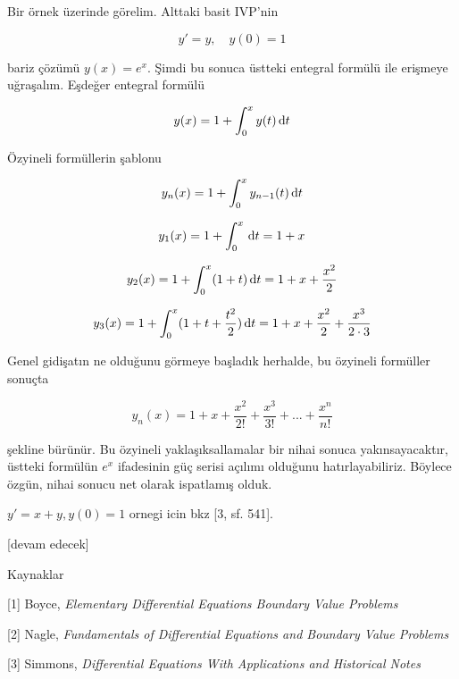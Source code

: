 \documentclass[12pt,fleqn]{article}\usepackage{../../common}
\begin{document}
Bir örnek üzerinde görelim. Alttaki basit IVP'nin

$$
y' = y, \quad y(0)=1
$$

bariz çözümü $y(x) = e^x$. Şimdi bu sonuca üstteki entegral formülü ile
erişmeye uğraşalım. Eşdeğer entegral formülü

$$
y(x) = 1 + \int _{0}^{x} y(t) \,\mathrm{d} t
$$

Özyineli formüllerin şablonu

$$
y_n(x) = 1 + \int_{0}^{x} y_{n-1}(t) \,\mathrm{d} t
$$

$$
y_1(x) = 1 + \int_{0}^{x} \,\mathrm{d} t = 1 + x
$$

$$
y_2(x) = 1 + \int_{0}^{x} (1+t) \,\mathrm{d} t = 1 + x + \frac{x^2}{2}
$$

$$
y_3(x) = 1 + \int_{0}^{x} (1 + t + \frac{t^2}{2}) \,\mathrm{d} t =
1 + x + \frac{x^2}{2} + \frac{x^3}{2 \cdot 3}
$$

Genel gidişatın ne olduğunu görmeye başladık herhalde, bu özyineli formüller
sonuçta

$$
y_n(x) = 1 + x + \frac{x^2}{2!} + \frac{x^3}{3!} + ... + \frac{x^n}{n!} 
$$

şekline bürünür. Bu özyineli yaklaşıksallamalar bir nihai sonuca
yakınsayacaktır, üstteki formülün $e^x$ ifadesinin güç serisi açılımı olduğunu
hatırlayabiliriz. Böylece özgün, nihai sonucu net olarak ispatlamış olduk.

$y' = x + y, y(0)=1$ ornegi icin bkz [3, sf. 541].



[devam edecek]

Kaynaklar

[1] Boyce, {\em Elementary Differential Equations Boundary Value Problems}

[2] Nagle, {\em Fundamentals of Differential Equations and Boundary Value Problems}

[3] Simmons, {\em Differential Equations With Applications and Historical Notes}
\end{document}
